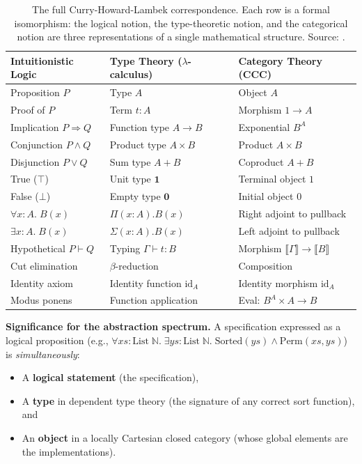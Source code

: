 \documentclass[11pt, a4paper, copyright]{googledeepmind}
\begin{document}
\begin{table}[H]
\centering
\small
\begin{tabular}{lll}
\toprule
\textbf{Intuitionistic Logic} & \textbf{Type Theory ($\lambda$-calculus)} & \textbf{Category Theory (CCC)} \\
\midrule
Proposition $P$ & Type $A$ & Object $A$ \\
Proof of $P$ & Term $t : A$ & Morphism $1 \to A$ \\
Implication $P \Rightarrow Q$ & Function type $A \to B$ & Exponential $B^A$ \\
Conjunction $P \wedge Q$ & Product type $A \times B$ & Product $A \times B$ \\
Disjunction $P \vee Q$ & Sum type $A + B$ & Coproduct $A + B$ \\
True ($\top$) & Unit type $\mathbf{1}$ & Terminal object $1$ \\
False ($\bot$) & Empty type $\mathbf{0}$ & Initial object $0$ \\
$\forall x{:}A.\; B(x)$ & $\Pi(x{:}A).B(x)$ & Right adjoint to pullback \\
$\exists x{:}A.\; B(x)$ & $\Sigma(x{:}A).B(x)$ & Left adjoint to pullback \\
Hypothetical $P \vdash Q$ & Typing $\Gamma \vdash t : B$ & Morphism $\llbracket\Gamma\rrbracket \to \llbracket B \rrbracket$ \\
Cut elimination & $\beta$-reduction & Composition \\
Identity axiom & Identity function $\text{id}_A$ & Identity morphism $\text{id}_A$ \\
Modus ponens & Function application & Eval: $B^A \times A \to B$ \\
\bottomrule
\end{tabular}
\caption{The full Curry-Howard-Lambek correspondence. Each row is a formal isomorphism: the logical notion, the type-theoretic notion, and the categorical notion are three representations of a single mathematical structure. Source: \citet{lambek1986higher, wadler2015propositions}.}
\label{tab:chl-full}
\end{table}

\textbf{Significance for the abstraction spectrum.} A specification expressed as a logical proposition (e.g., $\forall xs : \text{List}\;\mathbb{N}.\; \exists ys : \text{List}\;\mathbb{N}.\; \text{Sorted}(ys) \wedge \text{Perm}(xs, ys)$) is \emph{simultaneously}:
\begin{itemize}
    \item A \textbf{logical statement} (the specification),
    \item A \textbf{type} in dependent type theory (the signature of any correct sort function), and
    \item An \textbf{object} in a locally Cartesian closed category (whose global elements are the implementations).
\end{itemize}
\end{document}
